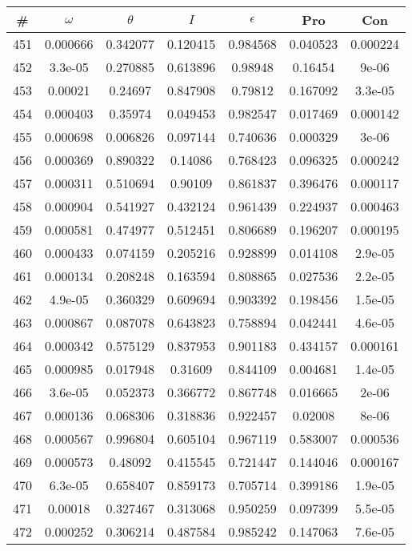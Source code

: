 \newpage
\begin{table}
\begin{tabular}{c|c|c|c|c|c|c}
\# & $\omega$ & $\theta$ & $I$ & $\epsilon$ & Pro & Con\\
\hline
451 & 0.000666 & 0.342077 & 0.120415 & 0.984568 & 0.040523 & 0.000224\\
452 & 3.3e-05 & 0.270885 & 0.613896 & 0.98948 & 0.16454 & 9e-06\\
453 & 0.00021 & 0.24697 & 0.847908 & 0.79812 & 0.167092 & 3.3e-05\\
454 & 0.000403 & 0.35974 & 0.049453 & 0.982547 & 0.017469 & 0.000142\\
455 & 0.000698 & 0.006826 & 0.097144 & 0.740636 & 0.000329 & 3e-06\\
456 & 0.000369 & 0.890322 & 0.14086 & 0.768423 & 0.096325 & 0.000242\\
457 & 0.000311 & 0.510694 & 0.90109 & 0.861837 & 0.396476 & 0.000117\\
458 & 0.000904 & 0.541927 & 0.432124 & 0.961439 & 0.224937 & 0.000463\\
459 & 0.000581 & 0.474977 & 0.512451 & 0.806689 & 0.196207 & 0.000195\\
460 & 0.000433 & 0.074159 & 0.205216 & 0.928899 & 0.014108 & 2.9e-05\\
461 & 0.000134 & 0.208248 & 0.163594 & 0.808865 & 0.027536 & 2.2e-05\\
462 & 4.9e-05 & 0.360329 & 0.609694 & 0.903392 & 0.198456 & 1.5e-05\\
463 & 0.000867 & 0.087078 & 0.643823 & 0.758894 & 0.042441 & 4.6e-05\\
464 & 0.000342 & 0.575129 & 0.837953 & 0.901183 & 0.434157 & 0.000161\\
465 & 0.000985 & 0.017948 & 0.31609 & 0.844109 & 0.004681 & 1.4e-05\\
466 & 3.6e-05 & 0.052373 & 0.366772 & 0.867748 & 0.016665 & 2e-06\\
467 & 0.000136 & 0.068306 & 0.318836 & 0.922457 & 0.02008 & 8e-06\\
468 & 0.000567 & 0.996804 & 0.605104 & 0.967119 & 0.583007 & 0.000536\\
469 & 0.000573 & 0.48092 & 0.415545 & 0.721447 & 0.144046 & 0.000167\\
470 & 6.3e-05 & 0.658407 & 0.859173 & 0.705714 & 0.399186 & 1.9e-05\\
471 & 0.00018 & 0.327467 & 0.313068 & 0.950259 & 0.097399 & 5.5e-05\\
472 & 0.000252 & 0.306214 & 0.487584 & 0.985242 & 0.147063 & 7.6e-05\\

\end{tabular}
\end{table}
